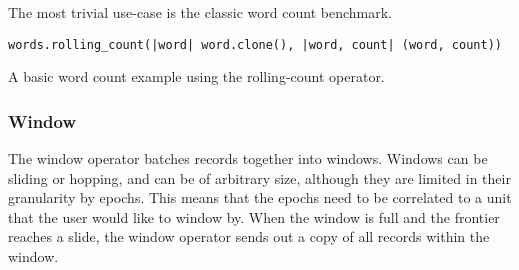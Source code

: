 The most trivial use-case is the classic word count benchmark.

\begin{listing}[H]
\begin{verbatim}
words.rolling_count(|word| word.clone(), |word, count| (word, count))
\end{verbatim}
\caption{A basic word count example using the rolling-count operator.}
\label{lst:rolling-count-example}
\end{listing}

\subsubsection{Window}
The window operator batches records together into windows. Windows can be sliding or hopping, and can be of arbitrary size, although they are limited in their granularity by epochs. This means that the epochs need to be correlated to a unit that the user would like to window by. When the window is full and the frontier reaches a slide, the window operator sends out a copy of all records within the window.

